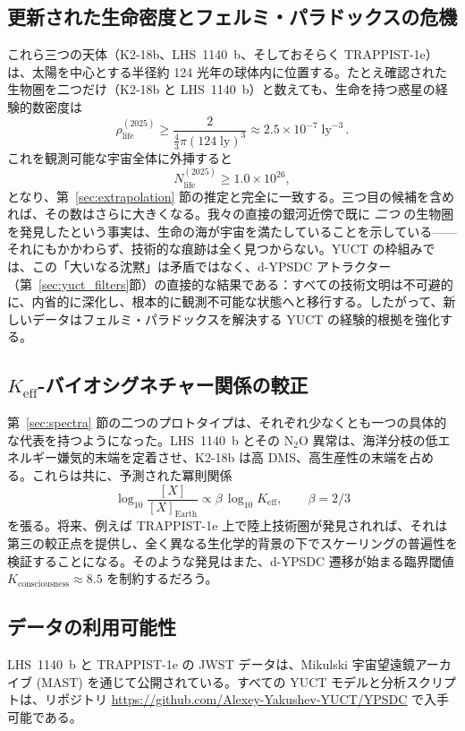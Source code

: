 \documentclass[11pt,a4paper]{article}
\begin{document}
	\subsection{更新された生命密度とフェルミ・パラドックスの危機}
	これら三つの天体（K2-18b、LHS~1140~b、そしておそらく TRAPPIST-1e）は、太陽を中心とする半径約 124 光年の球体内に位置する。たとえ確認された生物圏を二つだけ（K2-18b と LHS~1140~b）と数えても、生命を持つ惑星の経験的数密度は
	\begin{equation}
		\rho_{\mathrm{life}}^{(2025)} \ge \frac{2}{\frac{4}{3}\pi (124\;\mathrm{ly})^{3}} \approx 2.5\times10^{-7}\;\mathrm{ly}^{-3}\, .
	\end{equation}
	これを観測可能な宇宙全体に外挿すると
	\begin{equation}
		N_{\mathrm{life}}^{(2025)} \ge 1.0\times10^{26} ,
	\end{equation}
	となり、第~\ref{sec:extrapolation} 節の推定と完全に一致する。三つ目の候補を含めれば、その数はさらに大きくなる。我々の直接の銀河近傍で既に \emph{二つ} の生物圏を発見したという事実は、生命の海が宇宙を満たしていることを示している——それにもかかわらず、技術的な痕跡は全く見つからない。YUCT の枠組みでは、この「大いなる沈黙」は矛盾ではなく、d-YPSDC アトラクター（第~\ref{sec:yuct_filters}節）の直接的な結果である：すべての技術文明は不可避的に、内省的に深化し、根本的に観測不可能な状態へと移行する。したがって、新しいデータはフェルミ・パラドックスを解決する YUCT の経験的根拠を強化する。
	
	\subsection{\(K_{\mathrm{eff}}\)-バイオシグネチャー関係の較正}
	第~\ref{sec:spectra} 節の二つのプロトタイプは、それぞれ少なくとも一つの具体的な代表を持つようになった。LHS~1140~b とその N$_2$O 異常は、海洋分枝の低エネルギー嫌気的末端を定着させ、K2-18b は高 DMS、高生産性の末端を占める。これらは共に、予測された冪則関係
	\begin{equation}
		\log_{10} \frac{[X]}{[X]_{\mathrm{Earth}}} \propto \beta\,\log_{10} K_{\mathrm{eff}} ,\qquad \beta=2/3
	\end{equation}
	を張る。将来、例えば TRAPPIST-1e 上で陸上技術圏が発見されれば、それは第三の較正点を提供し、全く異なる生化学的背景の下でスケーリングの普遍性を検証することになる。そのような発見はまた、d-YPSDC 遷移が始まる臨界閾値 \(K_{\mathrm{consciousness}}\approx 8.5\) を制約するだろう。
	
	\subsection*{データの利用可能性}
	LHS~1140~b と TRAPPIST-1e の JWST データは、Mikulski 宇宙望遠鏡アーカイブ (MAST) を通じて公開されている。すべての YUCT モデルと分析スクリプトは、リポジトリ \url{https://github.com/Alexey-Yakushev-YUCT/YPSDC} で入手可能である。
	
\end{document}

